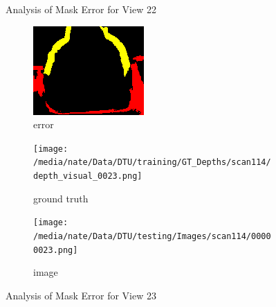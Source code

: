 \documentclass{article}
\begin{document}
\begin{figure}
\begin{subfigure}{0.3\textwidth}
		\label{fig:img22}
	\end{subfigure}
	\hfill
	\caption{Analysis of Mask Error for View 22}
	\label{fig:error_analys22}
\end{figure}\begin{figure}
	\centering
	\begin{subfigure}{0.3\textwidth}
		\centering
		\includegraphics[width=\textwidth]{./output/023_error.png}
		\caption{error}
		\label{fig:error23}
	\end{subfigure}
	\hfill
	\centering
	\begin{subfigure}{0.3\textwidth}
		\centering
		\texttt{[image: /media/nate/Data/DTU/training/GT\_Depths/scan114/depth\_visual\_0023.png]}
		\caption{ground truth}
		\label{fig:gt23}
	\end{subfigure}
	\hfill
	\centering
	\begin{subfigure}{0.3\textwidth}
		\centering
		\texttt{[image: /media/nate/Data/DTU/testing/Images/scan114/00000023.png]}
		\caption{image}
		\label{fig:img23}
	\end{subfigure}
	\hfill
	\caption{Analysis of Mask Error for View 23}
	\label{fig:error_analys23}
\end{figure}\begin{figure}
	\centering
	\begin{subfigure}{0.3\textwidth}
		\centering

\end{subfigure}
\end{figure}
\end{document}
